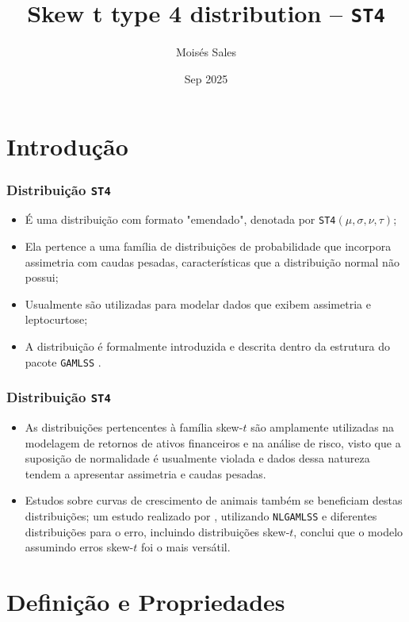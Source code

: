 \documentclass[13pt, aspectratio=169]{beamer}
\title{Skew t type 4 distribution -- \texttt{ST4}}
\author{Moisés Sales}
\date{Sep 2025}
\begin{document}
\maketitle
\section{Introdução}

\begin{frame}
    \frametitle{Distribuição \texttt{ST4}}

    \begin{itemize}
        \item É uma distribuição com formato "emendado", denotada por \texttt{ST4}$(\mu, \sigma, \nu, \tau)$;
        \pause
        \item Ela pertence a uma família de distribuições de probabilidade que incorpora assimetria com caudas pesadas, características que a distribuição normal não possui;
        \pause
        \item Usualmente são utilizadas para modelar dados que exibem assimetria e leptocurtose;
        \pause
        \item A distribuição é formalmente introduzida e descrita dentro da estrutura do pacote \texttt{GAMLSS} \parencite{rigby2019distributions}.
    \end{itemize}

\end{frame}
\begin{frame}
    \frametitle{Distribuição \texttt{ST4}}

    \begin{itemize}
        \item As distribuições pertencentes à família skew-$t$ são amplamente utilizadas na modelagem de retornos de ativos financeiros e na análise de risco, visto que a suposição de normalidade é usualmente violada e dados dessa natureza tendem a apresentar assimetria e caudas pesadas.
        \pause
        \item Estudos sobre curvas de crescimento de animais também se beneficiam destas distribuições; um estudo realizado por \textcite{campos2010ajuste}, utilizando \texttt{NLGAMLSS} e diferentes distribuições para o erro, incluindo distribuições skew-$t$, conclui que o modelo assumindo erros skew-$t$ foi o mais versátil. 
    \end{itemize}

\end{frame}

\section{Definição e Propriedades}
\end{document}
